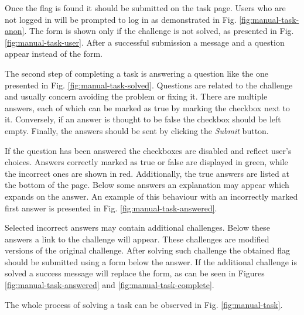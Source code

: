 Once the flag is found it should be submitted on the task page. Users who are not logged in will be prompted to log in as demonstrated in Fig. \ref{fig:manual-task-anon}. The form is shown only if the challenge is not solved, as presented in Fig. \ref{fig:manual-task-user}. After a successful submission a message and a question appear instead of the form.

The second step of completing a task is answering a question like the one presented in Fig. \ref{fig:manual-task-solved}. Questions are related to the challenge and usually concern avoiding the problem or fixing it. There are multiple answers, each of which can be marked as true by marking the checkbox next to it. Conversely, if an answer is thought to be false the checkbox should be left empty. Finally, the answers should be sent by clicking the \textit{Submit} button.

If the question has been answered the checkboxes are disabled and reflect user's choices. Answers correctly marked as true or false are displayed in green, while the incorrect ones are shown in red. Additionally, the true answers are listed at the bottom of the page. Below some answers an explanation may appear which expands on the answer. An example of this behaviour with an incorrectly marked first answer is presented in Fig. \ref{fig:manual-task-answered}.

Selected incorrect answers may contain additional challenges. Below these answers a link to the challenge will appear. These challenges are modified versions of the original challenge. After solving such challenge the obtained flag should be submitted using a form below the answer. If the additional challenge is solved a success message will replace the form, as can be seen in Figures \ref{fig:manual-task-answered} and \ref{fig:manual-task-complete}.

The whole process of solving a task can be observed in Fig. \ref{fig:manual-task}.

